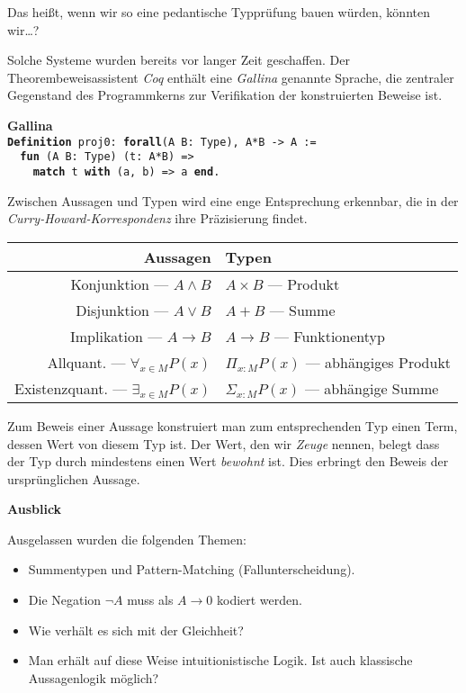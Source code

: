 \documentclass[9pt]{beamer}
\newcommand{\strong}[1]{\textsf{\textbf{#1}}}
\newcommand{\kw}[1]{\textbf{#1}}
\begin{document}
\begin{frame}
Das heißt, wenn wir so eine pedantische Typprüfung bauen würden,
könnten wir\ldots?\pause

\vspace{1em}
Solche Systeme wurden bereits vor langer Zeit geschaffen. Der
Theorembeweisassistent \emph{Coq} enthält eine \emph{Gallina} genannte
Sprache, die zentraler Gegenstand des Programmkerns zur Verifikation
der konstruierten Beweise ist.\pause

\vspace{1em}
\strong{Gallina}\\[4pt]
\texttt{\kw{Definition} proj0: \kw{forall}(A B: Type), A*B -> A :=\\
\ \ \kw{fun} (A B: Type) (t: A*B) =>\\
\ \ \ \ \kw{match} t \kw{with} (a, b) => a \kw{end}.}
\end{frame}

\begin{frame}
Zwischen Aussagen und Typen wird eine enge Entsprechung erkennbar,
die in der \emph{Curry-Howard-Korrespondenz} ihre Präzisierung findet.\pause
\begin{table}
\begin{tabular}{rl}
\toprule
\strong{Aussagen} & \strong{Typen}\\
\midrule
Konjunktion --- $A\land B$ & $A\times B$ --- Produkt\\
Disjunktion --- $A\lor B$ & $A+B$ --- Summe\\
Implikation --- $A\to B$ & $A\to B$ --- Funktionentyp\\
Allquant. --- $\forall_{x\in M} P(x)$ & $\Pi_{x\colon M} P(x)$ --- abhängiges Produkt\\
Existenzquant. --- $\exists_{x\in M} P(x)$ & $\Sigma_{x\colon M}P(x)$ --- abhängige Summe\\
\bottomrule
\end{tabular}
\end{table}\pause

Zum Beweis einer Aussage konstruiert man zum entsprechenden Typ
einen Term, dessen Wert von diesem Typ ist. Der Wert, den wir
\emph{Zeuge} nennen, belegt dass der Typ durch mindestens
einen Wert \emph{bewohnt} ist. Dies erbringt den Beweis der
ursprünglichen Aussage.
\end{frame}

\begin{frame}
\strong{Ausblick}

\vspace{1em}
Ausgelassen wurden die folgenden Themen:
\begin{itemize}
\item Summentypen und Pattern-Matching (Fallunterscheidung).
\item Die Negation $\neg A$ muss als $A\to 0$ kodiert werden.
\item Wie verhält es sich mit der Gleichheit?
\item Man erhält auf diese Weise intuitionistische Logik.
  Ist auch klassische Aussagenlogik möglich?
\end{itemize}
\end{frame}
\end{document}
